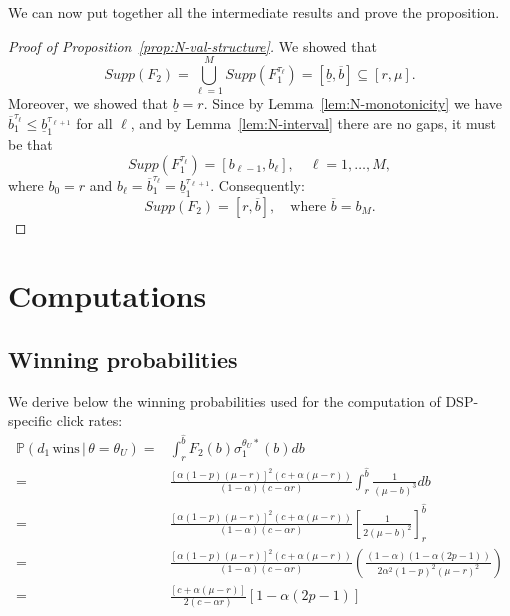 \noindent We can now put together all the intermediate results and prove the proposition.

\begin{proof}[Proof of Proposition~\ref{prop:N-val-structure}]
We showed that
\[
Supp(F_2) = \bigcup_{\ell=1}^{M} Supp(F_1^{\tau_\ell}) = [\underline{b}, \overline{b}] \subseteq [r, \mu].
\]
Moreover, we showed that $\underline{b} = r$. Since by Lemma~\ref{lem:N-monotonicity} we have $\overline{b}_1^{\tau_\ell} \leq \underline{b}_1^{\tau_{\ell+1}}$ for all $\ell$, and by Lemma~\ref{lem:N-interval} there are no gaps, it must be that
\[
Supp(F_1^{\tau_\ell}) = [b_{\ell-1}, b_\ell], \quad \ell = 1, \ldots, M,
\]
where $b_0 = r$ and $b_\ell = \overline{b}_1^{\tau_\ell} = \underline{b}_1^{\tau_{\ell+1}}$. Consequently:
\[
Supp(F_2) = [r, \overline{b}], \quad \text{where } \overline{b} = b_M.
\]
\end{proof}

\section{Computations}\label{computations}
\subsection{Winning probabilities}
We derive below the winning probabilities used for the computation of DSP-specific click rates:
\begin{align*}
    \mathbb{P}(d_1 \, \text{wins} \, | \, \theta = \theta_U) = & \int_{r}^{\hat{b}} F_2(b)\sigma_1^{\theta_U *}(b) db \\[5pt]
    = & \frac{\left[\alpha(1-p)(\mu-r)\right]^2(c+\alpha(\mu-r))}{(1-\alpha)(c-\alpha r)} \int_{r}^{\hat{b}} \frac{1}{(\mu-b)^3} db \\[5pt]
    = & \frac{\left[\alpha(1-p)(\mu-r)\right]^2(c+\alpha(\mu-r))}{(1-\alpha)(c-\alpha r)} \left[ \frac{1}{2(\mu-b)^2}\right]^{\hat{b}}_{r} \\[5pt]
    = & \frac{\left[\alpha(1-p)(\mu-r)\right]^2(c+\alpha(\mu-r))}{(1-\alpha)(c-\alpha r)} \left( \frac{(1-\alpha)(1-\alpha(2p-1))}{2\alpha^2(1-p)^2(\mu-r)^2} \right) \\[5pt]
    = & \frac{[c+\alpha(\mu-r)]}{2(c-\alpha r)} [1-\alpha(2p-1)]
\end{align*}

